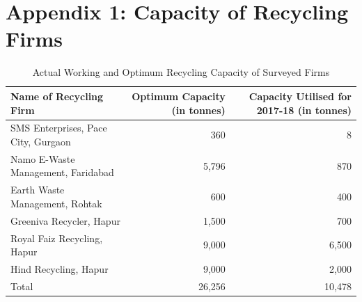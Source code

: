 \documentclass[a4paper, 12pt]{article}
\begin{document}
             \section*{Appendix 1: Capacity of Recycling Firms}
        \begin{table}[htbp]
          \centering
          \caption{Actual Working and Optimum Recycling Capacity of Surveyed Firms}
            \begin{tabular}{lrr}
            \multicolumn{1}{p{5em}}{Name of Recycling Firm} & \multicolumn{1}{p{5em}}{Optimum Capacity (in tonnes)} & \multicolumn{1}{p{7.915em}}{Capacity Utilised for 2017-18 (in tonnes)} \\
            \midrule
            SMS Enterprises, Pace City, Gurgaon & 360   & 8 \\
            Namo E-Waste Management, Faridabad & 5,796  & 870 \\
            Earth Waste Management, Rohtak & 600   & 400 \\
            Greeniva Recycler, Hapur & 1,500  & 700 \\
            Royal Faiz Recycling, Hapur  & 9,000  & 6,500 \\
            Hind Recycling, Hapur & 9,000  & 2,000 \\
            \midrule
            Total & 26,256 & 10,478 \\
            \end{tabular}%
          \label{tab:addlabel}%
        \end{table}%
        
\end{document}
